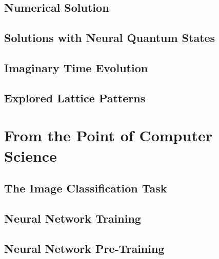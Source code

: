 \documentclass[
headings=optiontohead,              %
12pt,                               %
DIV=13,                             %
twoside=false,                      %
open=right,                         %
BCOR=10mm,                          %
toc=bibliographynumbered            %
]{scrreport}
\begin{document}
        \subsection{Numerical Solution}
        \label{sec:theory-numericalsolution}
        
        \FloatBarrier
        \subsection{Solutions with Neural Quantum States}
        \label{sec:theory-neuralquantumstates}
        
        \FloatBarrier
        \subsection{Imaginary Time Evolution}
        \label{sec:theory-imagenarytimeevolution}
        
        \FloatBarrier
        \subsection{Explored Lattice Patterns}
        \label{sec:theory-latticepatterns}
        
        \FloatBarrier
    \section{From the Point of Computer Science}
        \label{sec:theory-cs}
        
        \FloatBarrier
        \subsection{The Image Classification Task}
        \label{sec:theory-imageclassification}
        
        \FloatBarrier
        \subsection{Neural Network Training}
        \label{sec:theory-neuralnetworktraining}
        
        \FloatBarrier
        \subsection{Neural Network Pre-Training}
        \label{sec:theory-pretraining}
        
        \FloatBarrier
\end{document}
